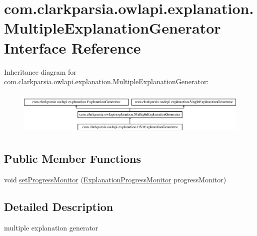 \hypertarget{interfacecom_1_1clarkparsia_1_1owlapi_1_1explanation_1_1_multiple_explanation_generator}{\section{com.\-clarkparsia.\-owlapi.\-explanation.\-Multiple\-Explanation\-Generator Interface Reference}
\label{interfacecom_1_1clarkparsia_1_1owlapi_1_1explanation_1_1_multiple_explanation_generator}
}
Inheritance diagram for com.\-clarkparsia.\-owlapi.\-explanation.\-Multiple\-Explanation\-Generator\-:\begin{figure}[H]
\begin{center}
\leavevmode
\includegraphics[height=2.164948cm]{interfacecom_1_1clarkparsia_1_1owlapi_1_1explanation_1_1_multiple_explanation_generator}
\end{center}
\end{figure}
\subsection*{Public Member Functions}
\begin{DoxyCompactItemize}
\item 
void \hyperlink{interfacecom_1_1clarkparsia_1_1owlapi_1_1explanation_1_1_multiple_explanation_generator_aa569f6b193c00707a5702c937005ec88}{set\-Progress\-Monitor} (\hyperlink{interfacecom_1_1clarkparsia_1_1owlapi_1_1explanation_1_1util_1_1_explanation_progress_monitor}{Explanation\-Progress\-Monitor} progress\-Monitor)
\end{DoxyCompactItemize}


\subsection{Detailed Description}
multiple explanation generator 

